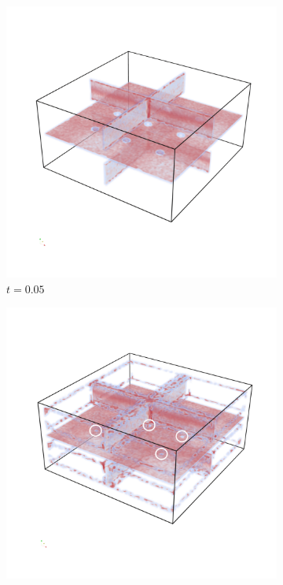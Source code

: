 \begin{figure}[ht]
    \centering
    \begin{subfigure}[]{0.7\textwidth}
        \includegraphics[trim=0 350 0 300, clip=true, width=\textwidth]{Images/MCridge.png}
        \caption{$t=0.05$}
        \label{fig:MCridge}
    \end{subfigure}
    \begin{subfigure}[]{0.49\textwidth}
        \includegraphics[trim=0 350 0 300, clip=true, width=\textwidth]{Images/MCridgetol.png}

\end{subfigure}
\end{figure}
